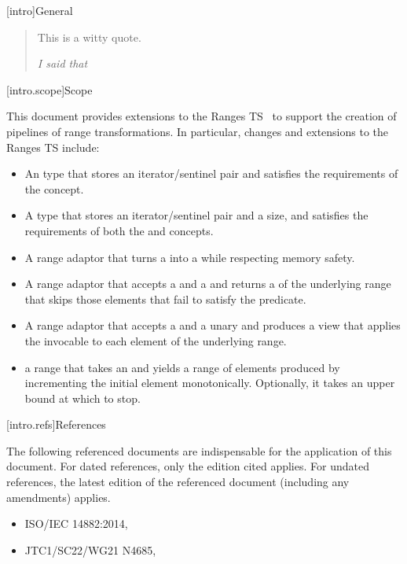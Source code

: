 [intro]{General}

\begin{quote}
This is a witty quote.
\begin{flushright}
\textemdash \textit{I said that}
\end{flushright}
\end{quote}

[intro.scope]{Scope}

\pnum
This document provides extensions to the Ranges TS~\cite{ranges-ts} to
support the creation of pipelines of range transformations. In particular,
changes and extensions to the Ranges TS include:

\begin{itemize}
\item An  type that stores an iterator/sentinel pair and
satisfies the requirements of the  concept.
\item A  type that stores an iterator/sentinel pair
and a size, and satisfies the requirements of both the  and
 concepts.
\item A  range adaptor that turns a  into a
 while respecting memory safety.
\item A  range adaptor that accepts a  and a
 and returns a  of the underlying range that skips
those elements that fail to satisfy the predicate.
\item A  range adaptor that accepts a  and a
unary  and produces a view that applies the invocable to each
element of the underlying range.
\item a  range that takes an  and
yields a range of elements produced by incrementing the initial element
monotonically. Optionally, it takes an upper bound at which to stop.
\end{itemize}

[intro.refs]{References}

\pnum
The following referenced documents are indispensable for the
application of this document. For dated references, only the
edition cited applies. For undated references, the latest edition
of the referenced document (including any amendments) applies.

\begin{itemize}
\item ISO/IEC 14882:2014, 
\item JTC1/SC22/WG21 N4685, 
\end{itemize}

